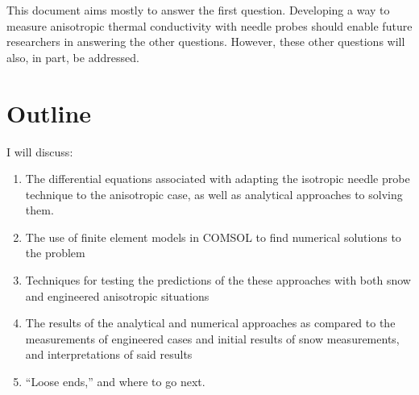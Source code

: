 This document aims mostly to answer the first question. Developing a way
to measure anisotropic thermal conductivity with needle probes should enable
future researchers in answering the other questions. However, these other
questions will also, in part, be addressed.

\section{Outline}


I will discuss:

\begin{enumerate}

\item The differential equations associated with adapting the isotropic needle
probe technique to the anisotropic case, as well as analytical approaches to
solving them.

\item The use of finite element models in COMSOL to find numerical solutions to
the problem

\item Techniques for testing the predictions of the these approaches with
both snow and engineered anisotropic situations

\item The results of the analytical and numerical approaches as compared to the
measurements of engineered cases and initial results of snow measurements, and
interpretations of said results

\item ``Loose ends,'' and where to go next.
\end{enumerate}
